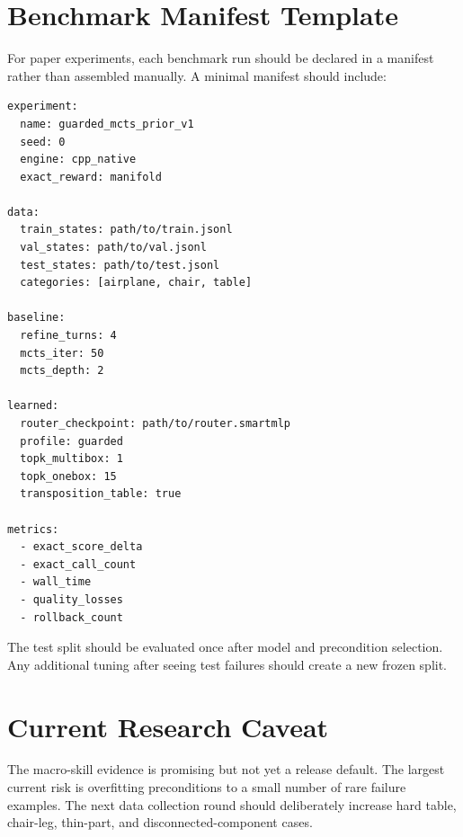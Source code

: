 \documentclass[10pt,twocolumn,letterpaper]{article}
\begin{document}
\section{Benchmark Manifest Template}

For paper experiments, each benchmark run should be declared in a manifest
rather than assembled manually.  A minimal manifest should include:

\begin{verbatim}
experiment:
  name: guarded_mcts_prior_v1
  seed: 0
  engine: cpp_native
  exact_reward: manifold

data:
  train_states: path/to/train.jsonl
  val_states: path/to/val.jsonl
  test_states: path/to/test.jsonl
  categories: [airplane, chair, table]

baseline:
  refine_turns: 4
  mcts_iter: 50
  mcts_depth: 2

learned:
  router_checkpoint: path/to/router.smartmlp
  profile: guarded
  topk_multibox: 1
  topk_onebox: 15
  transposition_table: true

metrics:
  - exact_score_delta
  - exact_call_count
  - wall_time
  - quality_losses
  - rollback_count
\end{verbatim}

The test split should be evaluated once after model and precondition selection.
Any additional tuning after seeing test failures should create a new frozen
split.

\section{Current Research Caveat}

The macro-skill evidence is promising but not yet a release default.  The
largest current risk is overfitting preconditions to a small number of rare
failure examples.  The next data collection round should deliberately increase
hard table, chair-leg, thin-part, and disconnected-component cases.

{\small


}
\end{document}
